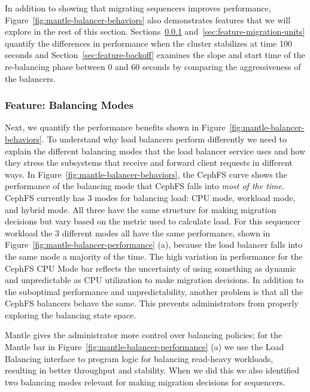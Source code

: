 In addition to showing that migrating sequencers improves performance,
Figure~\ref{fig:mantle-balancer-behaviors} also demonstrates features that we
will explore in the rest of this section.
Sections~\ref{sec:feature-balancing-modes}
and~\ref{sec:feature-migration-units} quantify the differences in performance
when the cluster stabilizes at time 100 seconds and
Section~\ref{sec:feature-backoff} examines the slope and start time of the
re-balancing phase between 0 and 60 seconds by comparing the aggressiveness of
the balancers.

\subsubsection{Feature: Balancing Modes}
\label{sec:feature-balancing-modes}

Next, we quantify the performance benefits shown in
Figure~\ref{fig:mantle-balancer-behaviors}.  To understand why load balancers
perform differently we need to explain the different balancing modes that the
load balancer service uses and how they stress the subsystems that receive and
forward client requests in different ways. In
Figure~\ref{fig:mantle-balancer-behaviors}, the CephFS curve shows the
performance of the balancing mode that CephFS falls into {\it most of the
time}.  CephFS currently has 3 modes for balancing load: CPU mode, workload mode, and
hybrid mode. All three have the same structure for making migration decisions
but vary based on the metric used to calculate load. For this sequencer
workload the 3 different modes all have the same performance, shown in
Figure~\ref{fig:mantle-balancer-performance} (a), because the load balancer
falls into the same mode a majority of the time.  The high variation in
performance for the CephFS CPU Mode bar reflects the uncertainty of using
something as dynamic and unpredictable as CPU utilization to make migration
decisions. 
In addition to the suboptimal performance and unpredictability,
another problem is that all the CephFS balancers behave the same. This
prevents administrators from properly
exploring the balancing state space.

Mantle gives the administrator more control over balancing policies; for the
Mantle bar in Figure~\ref{fig:mantle-balancer-performance} (a) we use the Load
Balancing interface to program logic for balancing read-heavy workloads,
resulting in better throughput and stability.  When we did this we also
identified two balancing modes relevant for making migration decisions for
sequencers. 

